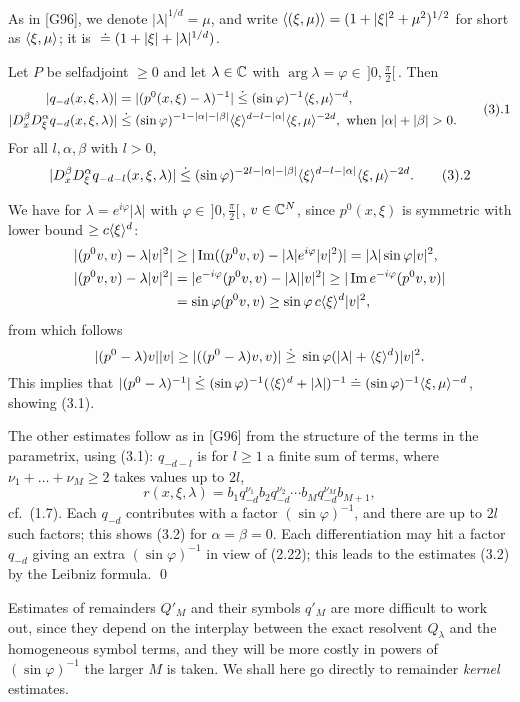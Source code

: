 As in [G96], we denote $|\lambda |^{1/d}=\mu $, and write $\langle {(\xi ,\mu )} \rangle=(1+|\xi
|^2+\mu ^2)^{1/2}$ for short as $\langle {\xi ,\mu } \rangle$;
it is $\;\dot {=}\; (1+|\xi |+|\lambda |^{1/d})$.

 Let $P$ be selfadjoint $\ge 0$ and let
$\lambda \in{\Bbb C}$ with $\arg \lambda =\varphi \in \,]0,\frac\pi
2[\,$. Then
$$
\aligned
|q_{-d}(x,\xi ,\lambda )|&=|(p^0(x,\xi )-\lambda )^{-1}|\leg (\sin \varphi )^{-1}\ang{\xi ,\mu }^{-d},\\
|D_{x}^\beta D_{\xi}^\alpha q_{-d}(x,\xi,\lambda )|&\leg (\sin \varphi
)^{-1-|\alpha |-|\beta |}\ang\xi ^{d-l-|\alpha |}\ang{\xi ,\mu }^{-2d}
,\text{ when }|\alpha |+|\beta |>0.
\endaligned\tag3.1
$$
For all $l,\alpha ,\beta $ with $l>0$,
$$
|D_{x}^\beta D_{\xi}^\alpha q_{-d-l}(x,\xi,\lambda )|\leg (\sin \varphi )^{-2l-|\alpha |-|\beta |}\ang\xi ^{d-l-|\alpha |}\ang{\xi ,\mu }^{-2d}.
\tag3.2
$$

\endproclaim

We have for  $\lambda =e^{i\varphi }|\lambda |$ with $\varphi \in
\,]0,\frac\pi 2[\,$,  $v\in{\Bbb C}^N$, since $p^0(x,\xi )$ is
symmetric with lower bound $\ge c\langle {\xi} \rangle ^d$:
$$\aligned
|(p^0v,v)-\lambda |v|^2|&\ge |\operatorname{Im}((p^0v,v)-|\lambda
|e^{i\varphi }|v|^2)|=|\lambda |\sin\varphi |v|^2,\\
|(p^0v,v)-\lambda |v|^2|&=|e^{-i\varphi }(p^0v,v)-|\lambda ||v|^2|\ge
|\operatorname{Im}e^{-i\varphi }(p^0v,v)|\\&=\sin\varphi (p^0v,v)\ge
\sin\varphi \,c\ang \xi ^d|v|^2,
\endaligned
$$
from which follows
$$
|(p^0-\lambda )v||v|\ge |((p^0-\lambda )v,v)|\;\dot{\ge}\; \sin\varphi (|\lambda |+\langle {\xi} \rangle ^d)|v|^2.
$$
 This implies that $|(p^0-\lambda )^{-1}|\;\dot{\le}\; (\sin\varphi
 )^{-1}(\langle {\xi} \rangle ^d+|\lambda |)^{-1}\;\dot {=}\; (\sin\varphi
 )^{-1}\langle {\xi ,\mu } \rangle^{-d}$, showing (3.1).

The other estimates follow as in [G96] from the structure of the
terms in the parametrix, using (3.1): $q_{-d-l}$ is for $l\ge 1$ a
finite sum of terms,
where $\nu _1+\dots+\nu _M\ge 2$ takes
values up to $2l$,
$$
r(x,\xi ,\lambda )=b_1q_{-d}^{\nu _1}b_2q_{-d}^{\nu _2}\cdots b_Mq_{-d}^{\nu _M}b_{M+1},
$$
cf.\  (1.7). Each $q_{-d}$ contributes with a factor $(\sin\varphi )^{-1}$,
and there are up to $2l$ such factors; this shows (3.2) for $\alpha
=\beta =0$. Each differentiation may hit a factor $q_{-d}$ giving an
extra $(\sin\varphi )^{-1}$ in view of (2.22); this leads to the
estimates (3.2) by the Leibniz formula.
\qed
\enddemo

Estimates of remainders $Q'_M$ and their symbols $q'_M$ are more
difficult to
work out, since they depend on the interplay between the exact
resolvent $Q_\lambda $ and the homogeneous symbol terms, and they will
be more
costly in powers of $(\sin\varphi )^{-1}$ the larger $M$ is taken. We
shall here go directly to remainder {\it kernel} estimates.

